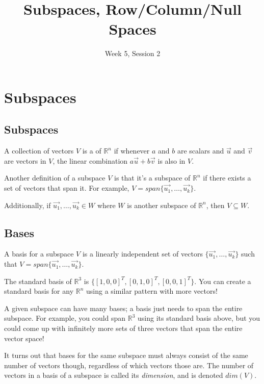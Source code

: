 \documentclass[11pt]{exam}
\title{Subspaces, Row/Column/Null Spaces}
\date{Week 5, Session 2}
\begin{document}
\maketitle

\section{Subspaces}
    
    \vspace{20px}
    \subsection{Subspaces}
    A collection of vectors $V$ is a  of $\mathbb{R}^n$ if whenever $a$ and $b$ are scalars and $\vec{u}$ and $\vec{v}$ are
    vectors in $V$, the linear combination $a\vec{u} + b\vec{v}$ is also in $V$.

    Another definition of a subspace $V$ is that it's a subspace of $\mathbb{R}^n$ if there exists a set of vectors that span it.
    For example, $V = span \{ \vec{u_1}, \dots, \vec{u_k} \}$.

    Additionally, if $\vec{u_1}, \dots, \vec{u_k} \in W$ where $W$ is another subspace of $\mathbb{R}^n$, then $V \subseteq W$.

    \vspace{20px}
    \subsection{Bases}
    A basis for a subspace $V$ is a linearly independent set of vectors $\{ \vec{u_1}, \dots, \vec{u_k} \}$ such that
    $V = span \{ \vec{u_1}, \dots, \vec{u_k} \}$.

    The standard basis of $\mathbb{R}^3$ is $\{ [1,0,0]^T, [0,1,0]^T, [0,0,1]^T \}$. You can create a standard basis for any $\mathbb{R}^n$
    using a similar pattern with more vectors!

    A given subspace can have many bases; a basis just needs to span the entire subspace. For example, you could span $\mathbb{R}^3$ using its standard
    basis above, but you could come up with infinitely more sets of three vectors that span the entire vector space!
    
    It turns out that bases for the same subspace must always consist of the same number of vectors though, regardless of which vectors those are.
    The number of vectors in a basis of a subspace is called its \textit{dimension}, and is denoted $dim(V)$.
\end{document}

